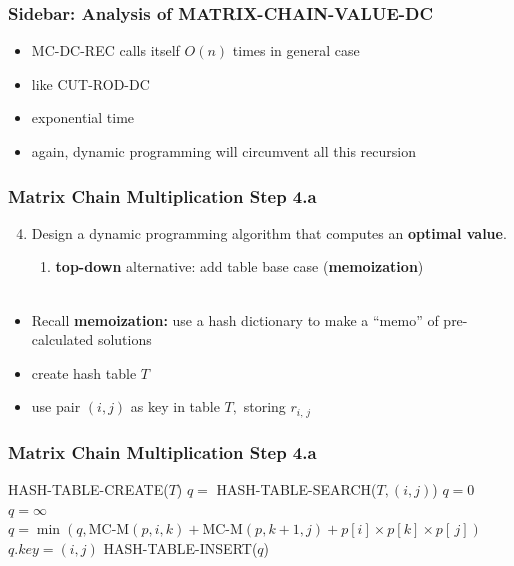 \documentclass{beamer}
\newcommand{\stanza}{ \\~\ }
\begin{document}
\begin{frame} \frametitle{Sidebar: Analysis of MATRIX-CHAIN-VALUE-DC}
\begin{itemize}
  \item MC-DC-REC calls itself $O(n)$ times in general case
  \item like CUT-ROD-DC
  \item exponential time
  \item again, dynamic programming will circumvent all this recursion
\end{itemize}
\end{frame}

\begin{frame} \frametitle{Matrix Chain Multiplication Step 4.a}
  \begin{enumerate}
    \setcounter{enumi}{3}
    \item Design a dynamic programming algorithm that computes an \textbf{optimal value}.
    \begin{enumerate}
      \item \textbf{top-down} alternative: add table base case (\textbf{memoization})
      \stanza
    \end{enumerate}
\end{enumerate}

\begin{itemize}
  \item Recall \textbf{memoization:} use a hash dictionary to make a ``memo'' of pre-calculated solutions
  \item create hash table $T$
  \item use pair $(i, j)$ as key in table $T,$ storing $r_{i,\, j}$
\end{itemize}
\end{frame}

\begin{frame} \frametitle{Matrix Chain Multiplication Step 4.a}
  {\scriptsize
  \begin{algorithmic}[1]
    \State HASH-TABLE-CREATE($T$)
    \State {}
    \EndFunction
    \State $q = $ HASH-TABLE-SEARCH($T, (i, j)$)
      \State {}
    \EndIf
      \State $q=0$
    \Else
      \State $q = \infty$
        \State $q = \min(q, \text{MC-M}(p, i, k) + \text{MC-M}(p, k+1, j)+ p[i] \times p[k] \times p[\, j])$
      \EndFor
    \EndIf
    \State $q.key = (i, j)$
    \State HASH-TABLE-INSERT($q$)
    \State {}
    \EndFunction
  \end{algorithmic}
  }
\end{frame}
\end{document}
